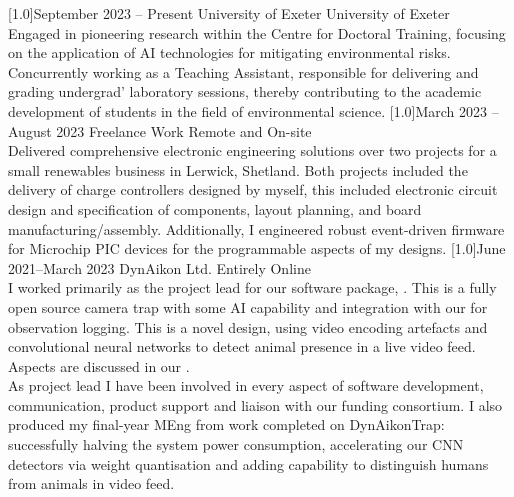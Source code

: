 \documentclass[]{cv-style}     %
\begin{document}
\begin{entrylist}
\entry
{\scalebox{.8}[1.0]{September 2023 -- Present}}
  {University of Exeter}
  {University of Exeter}
  {\\
  Engaged in pioneering research within the Centre for Doctoral Training, focusing on the application of AI technologies for mitigating environmental risks. Concurrently working as a Teaching Assistant, responsible for delivering and grading undergrad' laboratory sessions, thereby contributing to the academic development of students in the field of environmental science.
  }
\entry
  {\scalebox{.8}[1.0]{March 2023 -- August 2023}}
  {Freelance Work}
  {Remote and On-site}
  {\\
  Delivered comprehensive electronic engineering solutions over two projects for a small renewables business in Lerwick, Shetland. Both projects included the delivery of charge controllers designed by myself, this included electronic circuit design and specification of components, layout planning, and board manufacturing/assembly. Additionally, I engineered robust event-driven firmware for Microchip PIC devices for the programmable aspects of my designs. 
  }
\entry
  {\scalebox{.8}[1.0]{June 2021--March 2023}}
  {DynAikon Ltd.}
  {Entirely Online}
  {\\
  I worked primarily as the project lead for our software package, . This is a fully open source camera trap with some AI capability and integration with our  for observation logging. This is a novel design, using video encoding artefacts and convolutional neural networks to detect animal presence in a live video feed. Aspects are discussed in our . 
  \\
  As project lead I have been involved in every aspect of software development, communication, product support and liaison with our funding consortium. I also produced my final-year MEng  from work completed on DynAikonTrap: successfully halving the system power consumption, accelerating our CNN detectors via weight quantisation and adding capability to distinguish humans from animals in video feed. 
}
\end{entrylist}
\end{document}
